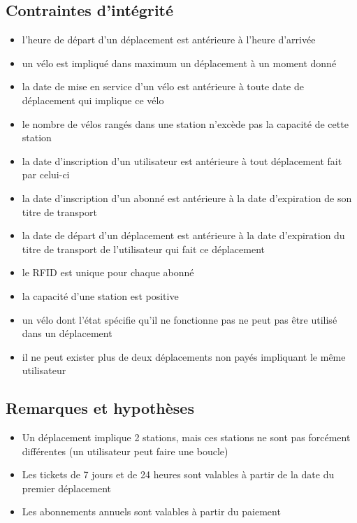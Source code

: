 \documentclass[a4paper]{article}
\begin{document}
\subsection{Contraintes d'intégrité}
\begin{itemize}
\item l'heure de départ d'un déplacement est antérieure à l'heure d'arrivée
\item un vélo est impliqué dans maximum un déplacement à un moment donné
\item la date de mise en service d'un vélo est antérieure à toute date de déplacement qui implique ce vélo
\item le nombre de vélos rangés dans une station n'excède pas la capacité de cette station
\item la date d'inscription d'un utilisateur est antérieure à tout déplacement fait par celui-ci
\item la date d'inscription d'un abonné est antérieure à la date d'expiration de son titre de transport
\item la date de départ d'un déplacement est antérieure à la date d'expiration du titre de transport de l'utilisateur qui fait ce déplacement
\item le RFID est unique pour chaque abonné
\item la capacité d'une station est positive
\item un vélo dont l'état spécifie qu'il ne fonctionne pas ne peut pas être utilisé dans un déplacement
\item il ne peut exister plus de deux déplacements non payés impliquant le même utilisateur
\end{itemize}

\subsection{Remarques et hypothèses}
\begin{itemize}
\item Un déplacement implique 2 stations, mais ces stations ne sont pas forcément différentes (un utilisateur peut faire une boucle)
\item Les tickets de 7 jours et de 24 heures sont valables à partir de la date du premier déplacement
\item Les abonnements annuels sont valables à partir du paiement
\end{itemize}
\end{document}
